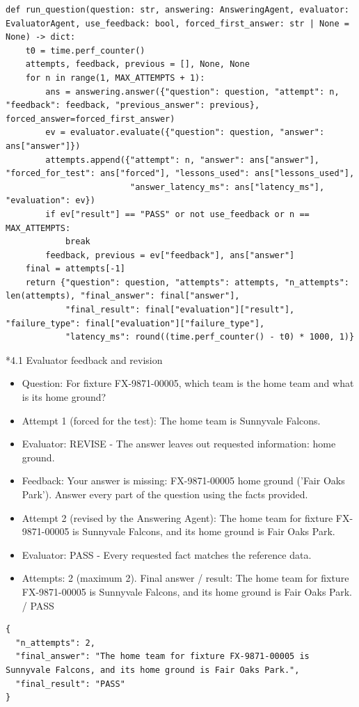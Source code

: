 \documentclass[11pt]{article}
\makeatletter
\renewcommand\subsection{\@startsection{subsection}{2}{\z@}{-2.2ex \@plus -1ex \@minus -.2ex}{0.8ex \@plus.2ex}{\normalfont\fontsize{12}{14.5}\selectfont\bfseries}}
\makeatother
\begin{document}
\endgroup
\begingroup\lstset{basicstyle=\ttfamily\tiny}
\begin{lstlisting}
def run_question(question: str, answering: AnsweringAgent, evaluator: EvaluatorAgent, use_feedback: bool, forced_first_answer: str | None = None) -> dict:
    t0 = time.perf_counter()
    attempts, feedback, previous = [], None, None
    for n in range(1, MAX_ATTEMPTS + 1):
        ans = answering.answer({"question": question, "attempt": n, "feedback": feedback, "previous_answer": previous}, forced_answer=forced_first_answer)
        ev = evaluator.evaluate({"question": question, "answer": ans["answer"]})
        attempts.append({"attempt": n, "answer": ans["answer"], "forced_for_test": ans["forced"], "lessons_used": ans["lessons_used"],
                         "answer_latency_ms": ans["latency_ms"], "evaluation": ev})
        if ev["result"] == "PASS" or not use_feedback or n == MAX_ATTEMPTS:
            break
        feedback, previous = ev["feedback"], ans["answer"]
    final = attempts[-1]
    return {"question": question, "attempts": attempts, "n_attempts": len(attempts), "final_answer": final["answer"],
            "final_result": final["evaluation"]["result"], "failure_type": final["evaluation"]["failure_type"],
            "latency_ms": round((time.perf_counter() - t0) * 1000, 1)}
\end{lstlisting}
\endgroup
\subsection*{4.1 Evaluator feedback and revision}
\begin{itemize}\setlength\itemsep{2pt}
\item Question: For fixture FX-9871-00005, which team is the home team and what is its home ground?
\item Attempt 1 (forced for the test): The home team is Sunnyvale Falcons.
\item Evaluator: REVISE - The answer leaves out requested information: home ground.
\item Feedback: Your answer is missing: FX-9871-00005 home ground ('Fair Oaks Park'). Answer every part of the question using the facts provided.
\item Attempt 2 (revised by the Answering Agent): The home team for fixture FX-9871-00005 is Sunnyvale Falcons, and its home ground is Fair Oaks Park.
\item Evaluator: PASS - Every requested fact matches the reference data.
\item Attempts: 2 (maximum 2). Final answer / result: The home team for fixture FX-9871-00005 is Sunnyvale Falcons, and its home ground is Fair Oaks Park. / PASS
\end{itemize}
\begingroup\lstset{basicstyle=\ttfamily\scriptsize}
\begin{lstlisting}
{
  "n_attempts": 2,
  "final_answer": "The home team for fixture FX-9871-00005 is Sunnyvale Falcons, and its home ground is Fair Oaks Park.",
  "final_result": "PASS"
}
\end{lstlisting}
\endgroup
\end{document}
